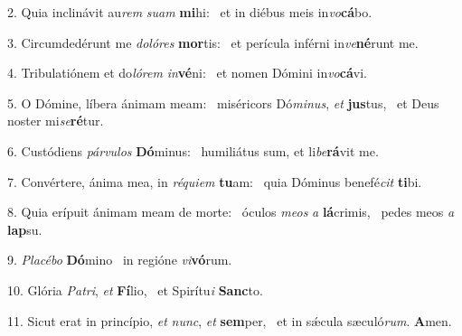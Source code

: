 2. Quia inclinávit au\textit{rem} \textit{su}\textit{am} \textbf{mi}hi: \ast\  et in diébus meis in\textit{vo}\textbf{cá}bo.\

3. Circumdedérunt me \textit{do}\textit{ló}\textit{res} \textbf{mor}tis: \ast\  et perícula inférni in\textit{ve}\textbf{né}runt me.\

4. Tribulatiónem et do\textit{ló}\textit{rem} \textit{in}\textbf{vé}ni: \ast\  et nomen Dómini in\textit{vo}\textbf{cá}vi.\

5. O Dómine, líbera ánimam meam: \dag\  miséricors Dó\textit{mi}\textit{nus}, \textit{et} \textbf{jus}tus, \ast\  et Deus noster mi\textit{se}\textbf{ré}tur.\

6. Custódiens \textit{pár}\textit{vu}\textit{los} \textbf{Dó}minus: \ast\  humiliátus sum, et li\textit{be}\textbf{rá}vit me.\

7. Convértere, ánima mea, in \textit{ré}\textit{qui}\textit{em} \textbf{tu}am: \ast\  quia Dóminus benefé\textit{cit} \textbf{ti}bi.\

8. Quia erípuit ánimam meam de morte: \dag\  óculos \textit{me}\textit{os} \textit{a} \textbf{lá}crimis, \ast\  pedes meos \textit{a} \textbf{lap}su.\

9. \textit{Pla}\textit{cé}\textit{bo} \textbf{Dó}mino \ast\  in regióne \textit{vi}\textbf{vó}rum.\

10. Glória \textit{Pa}\textit{tri}, \textit{et} \textbf{Fí}lio, \ast\  et Spirítu\textit{i} \textbf{Sanc}to.\

11. Sicut erat in princípio, \textit{et} \textit{nunc}, \textit{et} \textbf{sem}per, \ast\  et in sǽcula sæculó\textit{rum}. \textbf{A}men.\

